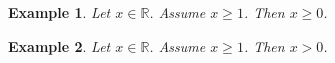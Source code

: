 \documentclass{article}
\newtheorem{example}{Example}
\begin{document}
\begin{example}
Let $x\in\mathbb{R}$. Assume $x\ge 1$. Then $x\ge 0$.
\end{example}

\begin{example}
Let $x\in\mathbb{R}$. Assume $x\ge 1$. Then $x> 0$.
\end{example}


\end{document}
